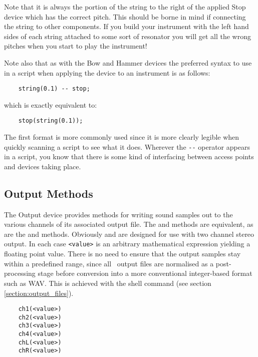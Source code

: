 Note that it is always the portion of the string to the right of the
applied Stop device which has the correct pitch. This should be borne
in mind if connecting the string to other components. If you build your
instrument with the left hand sides of each string attached to some sort
of resonator you will get all the wrong pitches when you start to play
the instrument!

Note also that as with the Bow and Hammer devices the preferred
syntax to use in a script when applying the device to an instrument
is as follows:

\begin{verbatim}
    string(0.1) -- stop;
\end{verbatim}

which is exactly equivalent to:

\begin{verbatim}
    stop(string(0.1));
\end{verbatim}

The first format is more commonly used since it is more clearly
legible when quickly scanning a script to see what it does. Wherever
the \verb|--| operator appears in a script, you know that there is
some kind of interfacing between access points and devices taking
place.

\subsection{Output Methods}
The Output device provides methods for writing sound
samples out to the various channels of its associated output file.
The   and  methods are equivalent, as are the
 and  methods. Obviously 
and  are designed for use with two channel stereo
output. In each case \verb|<value>| is an arbitrary mathematical
expression yielding a floating point value. There is no need to
ensure that the output samples stay within a predefined range, since
all \tao\ output files are normalised as a post-processing stage 
before conversion into a more conventional integer-based format
such as WAV. This is achieved with the 
shell command (see section \ref{section:output_files}).

\begin{verbatim}
    ch1(<value>)
    ch2(<value>)
    ch3(<value>)
    ch4(<value>)
    chL(<value>)
    chR(<value>)
\end{verbatim}


